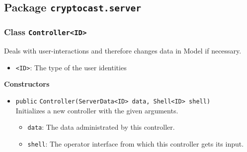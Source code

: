 \subsection{Package \lstinline!cryptocast.server!}

\subsubsection{Class \lstinline|Controller<ID>|}
Deals with user-interactions and therefore changes data in Model if necessary. \\



\begin{itemize}
\item \lstinline|<ID>|: The type of the user identities
\end{itemize}


\textbf{Constructors}
\begin{itemize}
\item \lstinline|public| \lstinline|Controller|\lstinline|(ServerData<ID> data, Shell<ID> shell)|\\
Initializes a new controller with the given arguments.
\begin{itemize}
\item \lstinline|data|: The data administrated by this controller.
\item \lstinline|shell|: The operator interface from which this controller gets its input.
\end{itemize}



\end{itemize}


